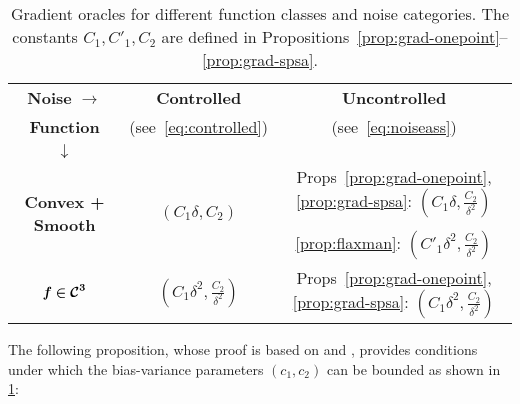 \begin{table}
\small
\centering
\begin{tabular}{|c|c|c|}
\toprule
\textbf{Noise }$\bm{ \rightarrow}$ & \textbf{Controlled } & \textbf{Uncontrolled } \\
\textbf{Function } &(see~\eqref{eq:controlled})&(see~\eqref{eq:noiseass})\\
$\bm{\downarrow}$ &&\\\midrule
\multirow{3}{*}{\textbf{Convex + Smooth}} 
	& \multirow{3}{*}{$(C_1 \delta, C_2)$} 
	& %
		{Props~\ref{prop:grad-onepoint},\ref{prop:grad-spsa}: $(C_1\delta, \frac{C_2}{\delta^2}) $}\\
&& \\
 &&{\cref{prop:flaxman}: $(C'_1\delta^2, \frac{C_2}{\delta^2}) $}\\\midrule
\multirow{2}{*}{$\bm{f \in \mathcal{C}^3}$} 
	& \multirow{2}{*}{$(C_1 \delta^2, \frac{C_2}{\delta^2})$} 
	& \multirow{2}{*}{Props~\ref{prop:grad-onepoint},\ref{prop:grad-spsa}: $(C_1 \delta^2, \frac{C_2}{\delta^2})$} \\
 &&\\\bottomrule
\end{tabular}
\caption{Gradient oracles for different function classes and noise categories. %
The constants $C_1, C'_1, C_2$ are defined in Propositions~\ref{prop:grad-onepoint}--\ref{prop:grad-spsa}.
}
\label{tab:oracles}
\end{table}
The following proposition, whose proof is based on \citep[Lemma~1]{spall1992multivariate} and \citep[Lemma~1]{duchi2015optimal}, provides conditions under which the bias-variance parameters $(c_1,c_2)$ can be bounded as shown in \cref{tab:oracles}:
